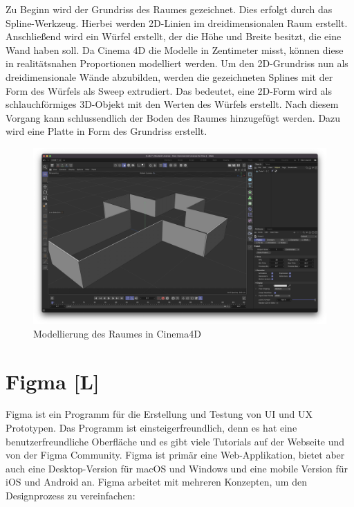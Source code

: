 Zu Beginn wird der Grundriss des Raumes gezeichnet. Dies erfolgt durch das Spline-Werkzeug. Hierbei werden 2D-Linien im dreidimensionalen Raum erstellt. Anschließend wird ein Würfel erstellt, der die Höhe und Breite besitzt, die eine Wand haben soll. Da Cinema 4D die Modelle in Zentimeter misst, können diese in realitätsnahen Proportionen modelliert werden. Um den 2D-Grundriss nun als dreidimensionale Wände abzubilden, werden die gezeichneten Splines mit der Form des Würfels als Sweep extrudiert. Das bedeutet, eine 2D-Form wird als schlauchförmiges 3D-Objekt mit den Werten des Würfels erstellt. Nach diesem Vorgang kann schlussendlich der Boden des Raumes hinzugefügt werden. Dazu wird eine Platte in Form des Grundriss erstellt. 

\begin{figure} [h t]
    \centering
    \includegraphics[scale=0.2]{pics/Room-model.png}
    \caption{Modellierung des Raumes in Cinema4D}
    \label{fig:tech:front:room-model}
  \end{figure}



\section{Figma [L]}
\label{ch::technologies::figma}
Figma ist ein Programm für die Erstellung und Testung von UI und UX Prototypen. Das Programm ist einsteigerfreundlich, denn es hat eine benutzerfreundliche Oberfläche und es gibt viele Tutorials auf der Webseite und von der Figma Community. Figma ist primär eine Web-Applikation, bietet aber auch eine Desktop-Version für macOS und Windows und eine mobile Version für iOS und Android an. Figma arbeitet mit mehreren Konzepten, um den Designprozess zu vereinfachen:
